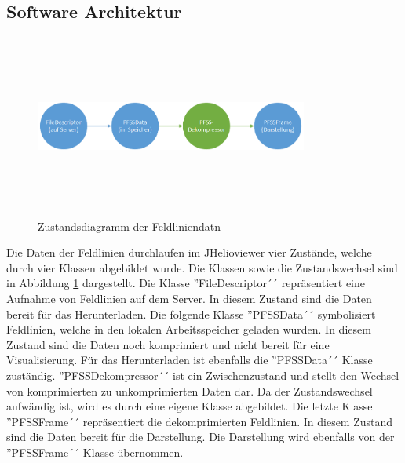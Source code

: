 \subsection{Software Architektur}
\begin{figure}[!htbp]
	\center
	\includegraphics[width=0.8\textwidth,height=6cm,keepaspectratio]{./pictures/implementation/dataflow.png}
	\caption{Zustandsdiagramm der Feldliniendatn}
	\label{implementation:architektur:datenfluss}
\end{figure}
Die Daten der Feldlinien durchlaufen im JHelioviewer vier Zustände, welche durch vier Klassen abgebildet wurde. Die Klassen sowie die Zustandswechsel sind in Abbildung \ref{implementation:architektur:datenfluss} dargestellt. Die Klasse ''FileDescriptor´´ repräsentiert eine Aufnahme von Feldlinien auf dem Server. In diesem Zustand sind die Daten bereit für das Herunterladen. Die folgende Klasse ''PFSSData´´ symbolisiert Feldlinien, welche in den lokalen Arbeitsspeicher geladen wurden. In diesem Zustand sind die Daten noch komprimiert und nicht bereit für eine Visualisierung. Für das Herunterladen ist ebenfalls die ''PFSSData´´ Klasse zuständig. ''PFSSDekompressor´´ ist ein Zwischenzustand und stellt den Wechsel von komprimierten zu unkomprimierten Daten dar. Da der Zustandswechsel aufwändig ist, wird es durch eine eigene Klasse abgebildet. Die letzte Klasse ''PFSSFrame´´ repräsentiert die dekomprimierten Feldlinien. In diesem Zustand sind die Daten bereit für die Darstellung. Die Darstellung wird ebenfalls von der ''PFSSFrame´´ Klasse übernommen.

